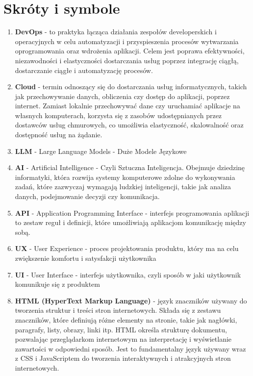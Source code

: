 \section{Skróty i symbole}

 \begin{enumerate}
    \item {\bf DevOps} - to praktyka łącząca działania zespołów developerskich i operacyjnych w celu automatyzacji i przyspieszenia procesów wytwarzania oprogramowania oraz wdrożenia aplikacji. Celem jest poprawa efektywności, niezawodności i elastyczności dostarczania usług poprzez integrację ciągłą, dostarczanie ciągłe i automatyzację procesów.
    
    \item {\bf Cloud} -  termin odnoszący się do dostarczania usług informatycznych, takich jak przechowywanie danych, obliczenia czy dostęp do aplikacji, poprzez internet. Zamiast lokalnie przechowywać dane czy uruchamiać aplikacje na własnych komputerach, korzysta się z zasobów udostępnianych przez dostawców usług chmurowych, co umożliwia elastyczność, skalowalność oraz dostępność usług na żądanie.
    
    \item {\bf LLM} - Large Language Models - Duże Modele Językowe
    
    \item {\bf AI} - Artificial Intelligence - Czyli Sztuczna Inteligencja. Obejmuje dziedzinę informatyki, która rozwija systemy komputerowe zdolne do wykonywania zadań, które zazwyczaj wymagają ludzkiej inteligencji, takie jak analiza danych, podejmowanie decyzji czy komunikacja.
    
    \item {\bf API} - Application Programming Interface - interfejs programowania aplikacji to zestaw reguł i definicji, które umożliwiają aplikacjom komunikację między sobą.
    
    \item {\bf UX} - User Experience - proces projektowania produktu, który ma na celu zwiększenie komfortu i satysfakcji użytkownika
    
    \item {\bf UI} - User Interface - interfejs użytkownika, czyli sposób w jaki użytkownik komunikuje się z produktem
   
    \item {\bf HTML (HyperText Markup Language)} - język znaczników używany do tworzenia struktur i treści stron internetowych. Składa się z zestawu znaczników, które definiują różne elementy na stronie, takie jak nagłówki, paragrafy, listy, obrazy, linki itp. HTML określa strukturę dokumentu, pozwalając przeglądarkom internetowym na interpretację i wyświetlanie zawartości w odpowiedni sposób. Jest to fundamentalny język używany wraz z CSS i JavaScriptem do tworzenia interaktywnych i atrakcyjnych stron internetowych.
    

\end{enumerate}
